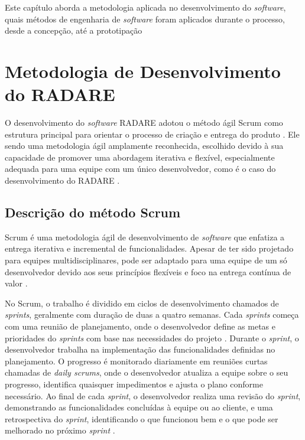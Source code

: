 \label{Cap:Metodologia}

Este capítulo aborda a metodologia aplicada no desenvolvimento do \textit{software}, quais métodos de engenharia de \textit{software} foram aplicados durante o processo, desde a concepção, até a prototipação

\section{Metodologia de Desenvolvimento do RADARE}

O desenvolvimento do \textit{software} RADARE adotou o método ágil Scrum como estrutura principal para orientar o processo de criação e entrega do produto \cite{softwareengreq}. Ele sendo uma metodologia ágil amplamente reconhecida, escolhido devido à sua capacidade de promover uma abordagem iterativa e flexível, especialmente adequada para uma equipe com um único desenvolvedor, como é o caso do desenvolvimento do RADARE \cite{scrum}.

\subsection{Descrição do método Scrum}

Scrum é uma metodologia ágil de desenvolvimento de \textit{software} que enfatiza a entrega iterativa e incremental de funcionalidades. Apesar de ter sido projetado para equipes multidisciplinares, pode ser adaptado para uma equipe de um só desenvolvedor devido aos seus princípios flexíveis e foco na entrega contínua de valor \cite{scrumlove}.
        
No Scrum, o trabalho é dividido em ciclos de desenvolvimento chamados de \textit{sprints}, geralmente com duração de duas a quatro semanas. Cada \textit{sprints} começa com uma reunião de planejamento, onde o desenvolvedor define as metas e prioridades do \textit{sprints} com base nas necessidades do projeto \cite{scrummic}. Durante o \textit{sprint}, o desenvolvedor trabalha na implementação das funcionalidades definidas no planejamento. O progresso é monitorado diariamente em reuniões curtas chamadas de \textit{daily scrums}, onde o desenvolvedor atualiza a equipe sobre o seu progresso, identifica quaisquer impedimentos e ajusta o plano conforme necessário. Ao final de cada \textit{sprint}, o desenvolvedor realiza uma revisão do \textit{sprint}, demonstrando as funcionalidades concluídas à equipe ou ao cliente, e uma retrospectiva do \textit{sprint}, identificando o que funcionou bem e o que pode ser melhorado no próximo \textit{sprint} \cite{scrumproj}.
        
